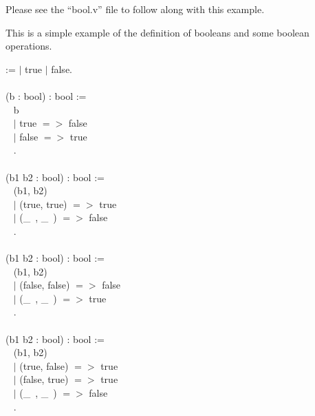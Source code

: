 
Please see the ``bool.v'' file to follow along with this example. 

\noindent
This is a simple example of the definition of booleans and some boolean operations.

\begin{code}
\Inductive {} :=
  $\mid$ true
  $\mid$ false.
\\ \\
\Definition {} (b : bool) : bool :=		\\ \-\ \quad
  \match b \with							\\ \-\ \quad
   $\mid$ true $=>$ false					\\ \-\ \quad
   $\mid$ false $=>$ true					\\ \-\ \quad
  \End.
\\ \\
\Definition {} (b1 b2 : bool) : bool :=	\\ \-\ \quad
  \match (b1, b2) \with					\\ \-\ \quad
   $\mid$ (true, true) $=>$ true				\\ \-\ \quad
   $\mid$ (\_\ , \_\ ) $=>$ false				\\ \-\ \quad
  \End.
\\ \\
\Definition {} (b1 b2 : bool) : bool :=		\\ \-\ \quad
  \match (b1, b2) \with					\\ \-\ \quad
   $\mid$ (false, false) $=>$ false			\\ \-\ \quad
   $\mid$ (\_\ , \_\ ) $=>$ true				\\ \-\ \quad
  \End.
\\ \\
\Definition {} (b1 b2 : bool) : bool :=		\\ \-\ \quad
  \match (b1, b2) \with					\\ \-\ \quad
   $\mid$ (true, false) $=>$ true				\\ \-\ \quad
   $\mid$ (false, true) $=>$ true				\\ \-\ \quad
   $\mid$ (\_\ , \_\ ) $=>$ false				\\ \-\ \quad
  \End.
\end{code}


